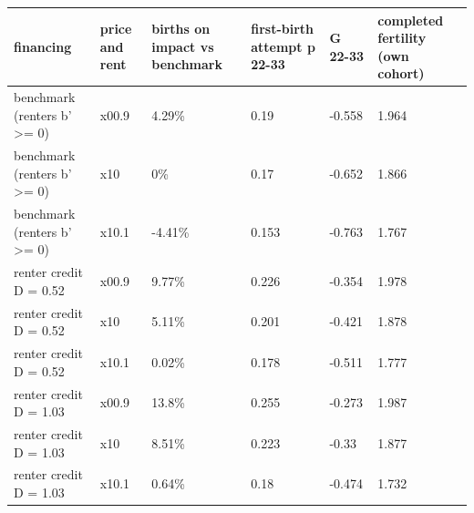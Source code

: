 \begingroup\small
\setlength{\tabcolsep}{3pt}
\renewcommand{\arraystretch}{1.04}
\begin{tabularx}{\linewidth}{XXXXXX}
\toprule
financing & price and rent & births on impact vs benchmark & first-birth attempt p 22-33 & G 22-33 & completed fertility (own cohort) \\
\midrule
benchmark (renters b' \textgreater{}= 0) & x00.9 & 4.29\% & 0.19 & -0.558 & 1.964 \\
benchmark (renters b' \textgreater{}= 0) & x10 & 0\% & 0.17 & -0.652 & 1.866 \\
benchmark (renters b' \textgreater{}= 0) & x10.1 & -4.41\% & 0.153 & -0.763 & 1.767 \\
renter credit D = 0.52 & x00.9 & 9.77\% & 0.226 & -0.354 & 1.978 \\
renter credit D = 0.52 & x10 & 5.11\% & 0.201 & -0.421 & 1.878 \\
renter credit D = 0.52 & x10.1 & 0.02\% & 0.178 & -0.511 & 1.777 \\
renter credit D = 1.03 & x00.9 & 13.8\% & 0.255 & -0.273 & 1.987 \\
renter credit D = 1.03 & x10 & 8.51\% & 0.223 & -0.33 & 1.877 \\
renter credit D = 1.03 & x10.1 & 0.64\% & 0.18 & -0.474 & 1.732 \\
\bottomrule
\end{tabularx}
\endgroup
